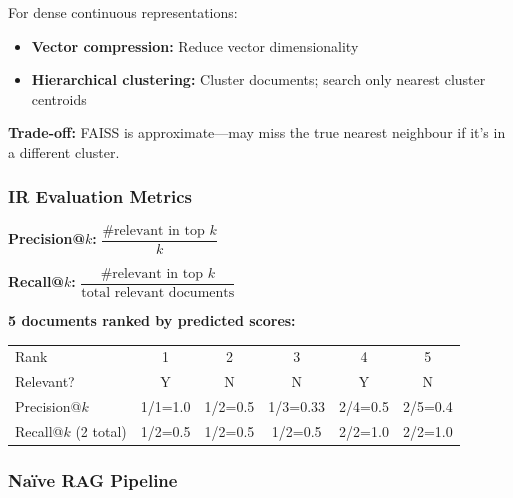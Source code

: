 \begin{defbox}
For dense continuous representations:
\begin{itemize}
  \item \textbf{Vector compression:} Reduce vector dimensionality
  \item \textbf{Hierarchical clustering:} Cluster documents; search only nearest cluster centroids
\end{itemize}

\textbf{Trade-off:} FAISS is approximate---may miss the true nearest neighbour if it's in a different cluster.
\end{defbox}

\bigseparator

\subsubsection{IR Evaluation Metrics}

\begin{defbox}
\textbf{Precision@$k$:} $\dfrac{\text{\# relevant in top } k}{k}$

\textbf{Recall@$k$:} $\dfrac{\text{\# relevant in top } k}{\text{total relevant documents}}$
\end{defbox}

\begin{exbox}
\textbf{5 documents ranked by predicted scores:}
\begin{center}
\begin{tabular}{@{} l c c c c c @{}}
\toprule
Rank & 1 & 2 & 3 & 4 & 5 \\
Relevant? & Y & N & N & Y & N \\
\midrule
Precision@$k$ & 1/1=1.0 & 1/2=0.5 & 1/3=0.33 & 2/4=0.5 & 2/5=0.4 \\
Recall@$k$ (2 total) & 1/2=0.5 & 1/2=0.5 & 1/2=0.5 & 2/2=1.0 & 2/2=1.0 \\
\bottomrule
\end{tabular}
\end{center}
\end{exbox}

\bigseparator

\subsubsection{Na\"ive RAG Pipeline}

